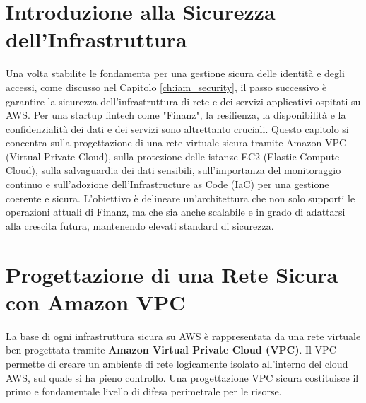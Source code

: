 \section{Introduzione alla Sicurezza dell'Infrastruttura}
Una volta stabilite le fondamenta per una gestione sicura delle identità e degli accessi, come discusso nel Capitolo \ref{ch:iam_security}, il passo successivo è garantire la sicurezza dell'infrastruttura di rete e dei servizi applicativi ospitati su AWS. Per una startup fintech come "Finanz", la resilienza, la disponibilità e la confidenzialità dei dati e dei servizi sono altrettanto cruciali. Questo capitolo si concentra sulla progettazione di una rete virtuale sicura tramite Amazon VPC (Virtual Private Cloud), sulla protezione delle istanze EC2 (Elastic Compute Cloud), sulla salvaguardia dei dati sensibili, sull'importanza del monitoraggio continuo e sull'adozione dell'Infrastructure as Code (IaC) per una gestione coerente e sicura. L'obiettivo è delineare un'architettura che non solo supporti le operazioni attuali di Finanz, ma che sia anche scalabile e in grado di adattarsi alla crescita futura, mantenendo elevati standard di sicurezza.

\section{Progettazione di una Rete Sicura con Amazon VPC}
\label{sec:vpc-design_cap2}
La base di ogni infrastruttura sicura su AWS è rappresentata da una rete virtuale ben progettata tramite \textbf{Amazon Virtual Private Cloud (VPC)}. Il VPC permette di creare un ambiente di rete logicamente isolato all'interno del cloud AWS, sul quale si ha pieno controllo. Una progettazione VPC sicura costituisce il primo e fondamentale livello di difesa perimetrale per le risorse.

